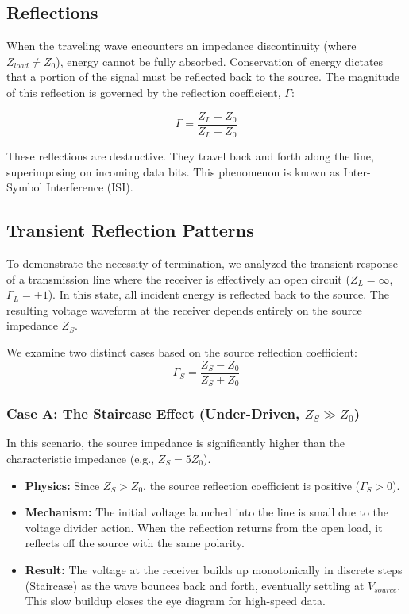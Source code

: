 \subsection{Reflections}
When the traveling wave encounters an impedance discontinuity (where $Z_{load} \neq Z_0$), energy cannot be fully absorbed. Conservation of energy dictates that a portion of the signal must be reflected back to the source. The magnitude of this reflection is governed by the reflection coefficient, $\Gamma$:

\begin{equation} \label{eq:reflection_coefficient}
    \Gamma = \frac{Z_L - Z_0}{Z_L + Z_0}
\end{equation}

These reflections are destructive. They travel back and forth along the line, superimposing on incoming data bits. This phenomenon is known as Inter-Symbol Interference (ISI).

\subsection{Transient Reflection Patterns}
To demonstrate the necessity of termination, we analyzed the transient response of a transmission line where the receiver is effectively an open circuit ($Z_L = \infty$, $\Gamma_L = +1$). In this state, all incident energy is reflected back to the source. The resulting voltage waveform at the receiver depends entirely on the source impedance $Z_S$.

We examine two distinct cases based on the source reflection coefficient:
\begin{equation}
    \Gamma_S = \frac{Z_S - Z_0}{Z_S + Z_0}
\end{equation}

\subsubsection{Case A: The Staircase Effect (Under-Driven, $Z_S \gg Z_0$)}
In this scenario, the source impedance is significantly higher than the characteristic impedance (e.g., $Z_S = 5Z_0$).
\begin{itemize}
    \item \textbf{Physics:} Since $Z_S > Z_0$, the source reflection coefficient is positive ($\Gamma_S > 0$).
    \item \textbf{Mechanism:} The initial voltage launched into the line is small due to the voltage divider action. When the reflection returns from the open load, it reflects off the source with the same polarity.
    \item \textbf{Result:} The voltage at the receiver builds up monotonically in discrete steps (Staircase) as the wave bounces back and forth, eventually settling at $V_{source}$. This slow buildup closes the eye diagram for high-speed data.
\end{itemize}

